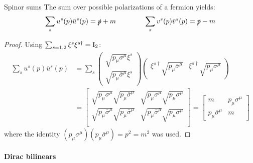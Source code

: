 \begin{proposition}{Spinor sums}{}
  The sum over possible polarizations of a fermion yields:
  \begin{equation}
    \sum_s u^s(p) \bar{u}^s(p) = \slashed{p} + m
    \qquad \qquad
    \sum_s v^s(p) \bar{v}^s(p) = \slashed{p} - m
    \label{eq:1.100}
  \end{equation}
  
  \tcblower

  \begin{proof}
    Using $ \sum_{s = 1,2} \xi^s \xi^{s \dagger} = \mathrm{I}_2 $:
    \begin{equation*}
      \begin{split}
        \sum_s u^s(p) \bar{u}^s(p)
        &= \sum_s
        \begin{pmatrix} \sqrt{p_\mu \sigma^\mu} \xi^s \\ \sqrt{p_\mu \bar{\sigma}^\mu} \xi^s \end{pmatrix}
        \begin{pmatrix} \xi^{s \dagger} \sqrt{p_\mu \bar{\sigma}^\mu} & \xi^{s \dagger} \sqrt{p_\mu \sigma^\mu} \end{pmatrix} \\
        &=
        \begin{bmatrix}
          \sqrt{p_\mu \sigma^\mu} \sqrt{p_\mu \bar{\sigma}^\mu} & \sqrt{p_\mu \sigma^\mu} \sqrt{p_\mu \sigma^\mu} \\
          \sqrt{p_\mu \bar{\sigma}^\mu} \sqrt{p_\mu \bar{\sigma}^\mu} & \sqrt{p_\mu \bar{\sigma}^\mu} \sqrt{p_\mu \sigma^\mu} \\
        \end{bmatrix}
        =
        \begin{bmatrix}
          m & p_\mu \sigma^\mu \\ p_\mu \bar{\sigma}^\mu & m
        \end{bmatrix}
      \end{split}
    \end{equation*}
    where the identity $ (p_\mu \sigma^\mu) (p_\mu \bar{\sigma}^\mu) = p^2 = m^2 $ was used.
  \end{proof}
\end{proposition}

\paragraph{Dirac bilinears}

